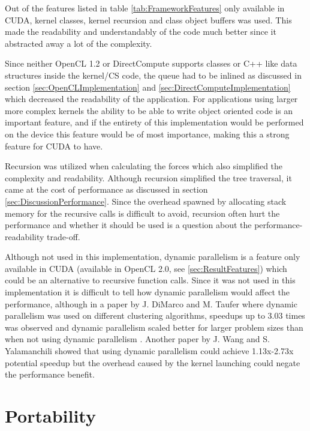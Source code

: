 Out of the features listed in table \ref{tab:FrameworkFeatures} only available in CUDA, kernel classes, kernel recursion and class object buffers was used. This made the readability and understandably of the code much better since it abstracted away a lot of the complexity. 

Since neither OpenCL 1.2 or DirectCompute supports classes or C++ like data structures inside the kernel/CS code, the queue had to be inlined as discussed in section  \ref{sec:OpenCLImplementation} and \ref{sec:DirectComputeImplementation} which decreased the readability of the application. For applications using larger more complex kernels the ability to be able to write object oriented code is an important feature, and if the entirety of this implementation would be performed on the device this feature would be of most importance, making this a strong feature for CUDA to have. 

Recursion was utilized when calculating the forces which also simplified the complexity and readability. Although recursion simplified the tree traversal, it came at the cost of performance as discussed in section \ref{sec:DiscussionPerformance}. Since the overhead spawned by allocating stack memory for the recursive calls is difficult to avoid, recursion often hurt the performance and whether it should be used is a question about the performance-readability trade-off. 

Although not used in this implementation, dynamic parallelism is a feature only available in CUDA (available in OpenCL 2.0, see \ref{sec:ResultFeatures}) which could be an alternative to recursive function calls. Since it was not used in this implementation it is difficult to tell how dynamic parallelism would affect the performance, although in a paper by J. DiMarco and M. Taufer where dynamic parallelism was used on different clustering algorithms, speedups up to 3.03 times was observed and dynamic parallelism scaled better for larger problem sizes than when not using dynamic parallelism \cite{dimarco2013performance}. Another paper by J. Wang and S. Yalamanchili showed that using dynamic parallelism could achieve 1.13x-2.73x potential speedup but the overhead caused by the kernel launching could negate the performance benefit. \cite{wang2014characterization}





\section{Portability}





